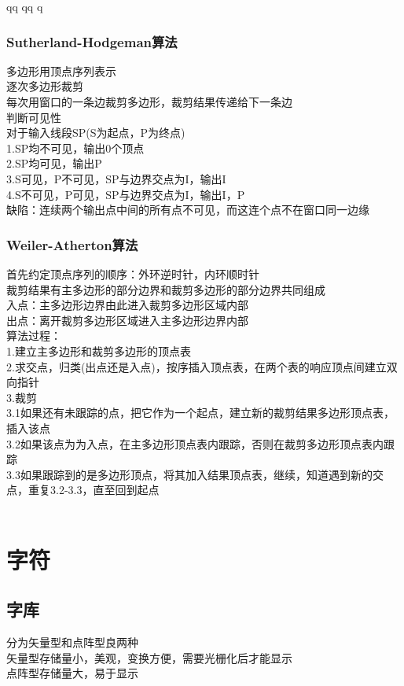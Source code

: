 qq	qq	q                                                                                                                                                                                                                                                                                      \documentclass{article}
\begin{document}
\begin{CJK}{UTF8}{gbsn}
	\subsubsection{Sutherland-Hodgeman算法}
	多边形用顶点序列表示\\
	逐次多边形裁剪\\
	每次用窗口的一条边裁剪多边形，裁剪结果传递给下一条边\\
	判断可见性\\
	对于输入线段SP(S为起点，P为终点)\\
	1.SP均不可见，输出0个顶点\\
	2.SP均可见，输出P\\
	3.S可见，P不可见，SP与边界交点为I，输出I\\
	4.S不可见，P可见，SP与边界交点为I，输出I，P\\
	缺陷：连续两个输出点中间的所有点不可见，而这连个点不在窗口同一边缘\\	
	\subsubsection{Weiler-Atherton算法}
	首先约定顶点序列的顺序：外环逆时针，内环顺时针\\
	裁剪结果有主多边形的部分边界和裁剪多边形的部分边界共同组成\\
	入点：主多边形边界由此进入裁剪多边形区域内部\\
	出点：离开裁剪多边形区域进入主多边形边界内部\\
	算法过程：\\
	1.建立主多边形和裁剪多边形的顶点表\\
	2.求交点，归类(出点还是入点)，按序插入顶点表，在两个表的响应顶点间建立双向指针\\
	3.裁剪\\
	3.1如果还有未跟踪的点，把它作为一个起点，建立新的裁剪结果多边形顶点表，插入该点\\
	3.2如果该点为为入点，在主多边形顶点表内跟踪，否则在裁剪多边形顶点表内跟踪\\
	3.3如果跟踪到的是多边形顶点，将其加入结果顶点表，继续，知道遇到新的交点，重复3.2-3.3，直至回到起点\\
	\\
	\section{字符}
	\subsection{字库}
	分为矢量型和点阵型良两种\\
	矢量型存储量小，美观，变换方便，需要光栅化后才能显示\\
	点阵型存储量大，易于显示\\

\end{CJK}
\end{document}

